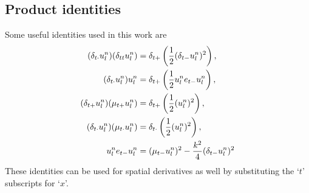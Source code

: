 

\subsection{Product identities}\label{sec:prodIdentities}
Some useful identities used in this work are
\begin{subequations}
    \begin{align}
        (\delta_{t\cdot} u_l^n)(\delta_{tt} u_l^n) &= \delta_{t+} \left(\frac{1}{2}(\delta_{t-} u_l^n)^2\right),\label{eq:prodIdentity1}\\
        (\delta_{t\cdot} u_l^n)u_l^n &= \delta_{t+} \left(\frac{1}{2}u_l^n e_{t-}u_l^n\right),\label{eq:prodIdentity2}\\
        (\delta_{t+} u_l^n)(\mu_{t+} u_l^n) &= \delta_{t+} \left(\frac{1}{2}(u_l^n)^2\right),\label{eq:prodIdentity3}\\
        (\delta_{t\cdot} u_l^n)(\mu_{t\cdot}u_l^n) &= \delta_{t\cdot}\left(\frac{1}{2} (u_l^n)^2\right),\label{eq:prodIdentity4}\\
        u_l^n e_{t-}u_l^n &=  (\mu_{t-} u_l^n)^2 - \frac{k^2}{4}(\delta_{t-} u_l^n)^2\label{eq:prodIdentityEnergyStab}
    \end{align}
\end{subequations}
These identities can be used for spatial derivatives as well by substituting the `$t$' subscripts for `$x$'.

